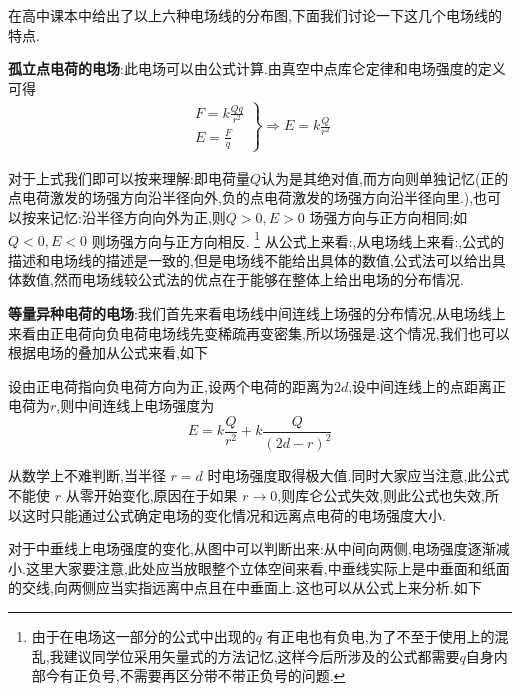 在高中课本中给出了以上六种电场线的分布图,下面我们讨论一下这几个电场线的特点.

{\bf 孤立点电荷的电场}:此电场可以由公式计算.由真空中点库仑定律和电场强度的定义可得
\begin{gather}
  \left.
    \begin{gathered}
      F=k\frac{Qq}{r^2}\\
      E=\frac{F}{q}
    \end{gathered}
  \right\}
  \Longrightarrow
  E=k\frac{Q}{r^2}
\end{gather}

对于上式我们即可以按来理解:即电荷量$Q$认为是其绝对值,而方向则单独记忆(正的点电荷激发的场强方向沿半径向外,负的点电荷激发的场强方向沿半径向里.),也可以按来记忆:沿半径方向向外为正,则$Q>0 , E>0$ 场强方向与正方向相同;如$Q<0,E<0$ 则场强方向与正方向相反.
\footnote{由于在电场这一部分的公式中出现的$q$ 有正电也有负电,为了不至于使用上的混乱,我建议同学位采用矢量式的方法记忆,这样今后所涉及的公式都需要$q$自身内部今有正负号,不需要再区分带不带正负号的问题.}
从公式上来看:,从电场线上来看:,公式的描述和电场线的描述是一致的,但是电场线不能给出具体的数值,公式法可以给出具体数值,然而电场线较公式法的优点在于能够在整体上给出电场的分布情况.

{\bf 等量异种电荷的电场}:我们首先来看电场线中间连线上场强的分布情况,从电场线上来看由正电荷向负电荷电场线先变稀疏再变密集,所以场强是.这个情况,我们也可以根据电场的叠加从公式来看,如下

  设由正电荷指向负电荷方向为正,设两个电荷的距离为$2d$,设中间连线上的点距离正电荷为$r$,则中间连线上电场强度为 
  \begin{equation}
    E=k\frac{Q}{r^2}+k\frac{Q}{(2d-r)^2}
  \end{equation}

  从数学上不难判断,当半径 $r=d$ 时电场强度取得极大值.同时大家应当注意,此公式不能使 $r$ 从零开始变化,原因在于如果 $r\to 0$,则库仑公式失效,则此公式也失效,所以这时只能通过公式确定电场的变化情况和远离点电荷的电场强度大小.

  对于中垂线上电场强度的变化,从图中可以判断出来:从中间向两侧,电场强度逐渐减小.这里大家要注意,此处应当放眼整个立体空间来看,中垂线实际上是中垂面和纸面的交线,向两侧应当实指远离中点且在中垂面上.这也可以从公式上来分析.如下


